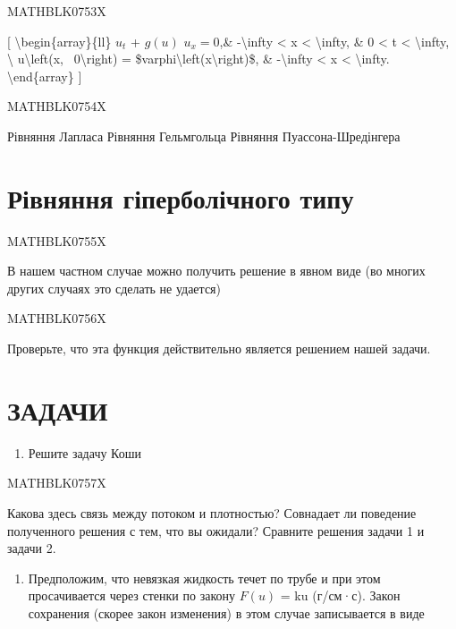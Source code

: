 \documentclass[
]{article}
\providecommand{\tightlist}{%
  \setlength{\itemsep}{0pt}\setlength{\parskip}{0pt}}
\begin{document}
{{{MATHBLK0753X

{[} \textbackslash begin\{array\}\{ll\} \(u_t\) + \(g\left(u\right)\)
\(u_x = 0\),\& -\textbackslash infty \textless{} x \textless{}
\textbackslash infty, \& 0 \textless{} t \textless{}
\textbackslash infty, \textbackslash{} u\textbackslash left(x,
~0\textbackslash right) =
\$varphi\textbackslash left(x\textbackslash right)\$, \&
-\textbackslash infty \textless{} x \textless{} \textbackslash infty.
\textbackslash end\{array\} {]}

MATHBLK0754X

Рівняння Лапласа Рівняння Гельмгольца Рівняння Пуассона-Шредінгера

\section{Рівняння гіперболічного
типу}\label{ux440ux456ux432ux43dux44fux43dux43dux44f-ux433ux456ux43fux435ux440ux431ux43eux43bux456ux447ux43dux43eux433ux43e-ux442ux438ux43fux443}

MATHBLK0755X

В нашем частном случае можно получить решение в явном виде (во многих
других случаях это сделать не удается)

MATHBLK0756X

Проверьте, что эта функция действительно является решением нашей задачи.

\section{\texorpdfstring{\textbf{ЗАДАЧИ}}{ЗАДАЧИ}}\label{ux437ux430ux434ux430ux447ux438-9}

\begin{enumerate}
\def\labelenumi{\arabic{enumi}.}
\tightlist
\item
  Решите задачу Коши
\end{enumerate}

MATHBLK0757X

Какова здесь связь между потоком и плотностью? Совнадает ли поведение
полученного решения с тем, что вы ожидали? Сравните решения задачи 1 и
задачи 2.

\begin{enumerate}
\def\labelenumi{\arabic{enumi}.}
\setcounter{enumi}{2}
\tightlist
\item
  Предположим, что невязкая жидкость течет по трубе и при этом
  просачивается через стенки по закону \(F(u)\) = ku (г/см·с). Закон
  сохранения (скорее закон изменения) в этом случае записывается в виде
\end{enumerate}

}}}
\end{document}
